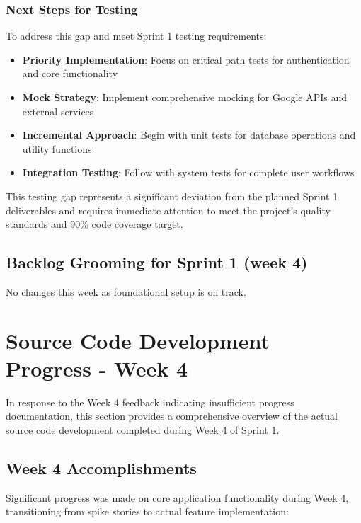 \documentclass[12pt]{article}
\begin{document}
\subsubsection{Next Steps for Testing}
To address this gap and meet Sprint 1 testing requirements:

\begin{itemize}
  \item \textbf{Priority Implementation}: Focus on critical path tests for authentication and core functionality
  \item \textbf{Mock Strategy}: Implement comprehensive mocking for Google APIs and external services
  \item \textbf{Incremental Approach}: Begin with unit tests for database operations and utility functions
  \item \textbf{Integration Testing}: Follow with system tests for complete user workflows
\end{itemize}

This testing gap represents a significant deviation from the planned Sprint 1 deliverables and requires immediate attention to meet the project's quality standards and 90\% code coverage target.

\subsection{Backlog Grooming for Sprint 1 (week 4)}
No changes this week as foundational setup is on track.

\section{Source Code Development Progress - Week 4}

In response to the Week 4 feedback indicating insufficient progress documentation, this section provides a comprehensive overview of the actual source code development completed during Week 4 of Sprint 1.

\subsection{Week 4 Accomplishments}
Significant progress was made on core application functionality during Week 4, transitioning from spike stories to actual feature implementation:
\end{document}
